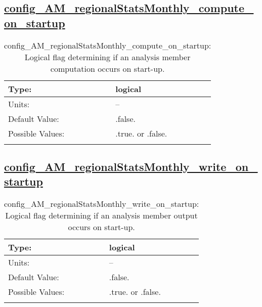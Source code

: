 \subsection[config\_AM\_regionalStatsMonthly\_compute\_on\_startup]{\hyperref[sec:nm_tab_AM_regionalStatsMonthly]{config\_AM\_regionalStatsMonthly\_compute\_on\_startup}}
\label{subsec:nm_sec_config_AM_regionalStatsMonthly_compute_on_startup}
\begin{center}
\begin{longtable}{| p{2.0in} || p{4.0in} |}
    \hline
    Type: & logical \\
    \hline
    Units: & -- \\
    \hline
    Default Value: & .false. \\
    \hline
    Possible Values: & .true. or .false. \\
    \hline
    \caption{config\_AM\_regionalStatsMonthly\_compute\_on\_startup: Logical flag determining if an analysis member computation occurs on start-up.}
\end{longtable}
\end{center}
\subsection[config\_AM\_regionalStatsMonthly\_write\_on\_startup]{\hyperref[sec:nm_tab_AM_regionalStatsMonthly]{config\_AM\_regionalStatsMonthly\_write\_on\_startup}}
\label{subsec:nm_sec_config_AM_regionalStatsMonthly_write_on_startup}
\begin{center}
\begin{longtable}{| p{2.0in} || p{4.0in} |}
    \hline
    Type: & logical \\
    \hline
    Units: & -- \\
    \hline
    Default Value: & .false. \\
    \hline
    Possible Values: & .true. or .false. \\
    \hline
    \caption{config\_AM\_regionalStatsMonthly\_write\_on\_startup: Logical flag determining if an analysis member output occurs on start-up.}
\end{longtable}
\end{center}

